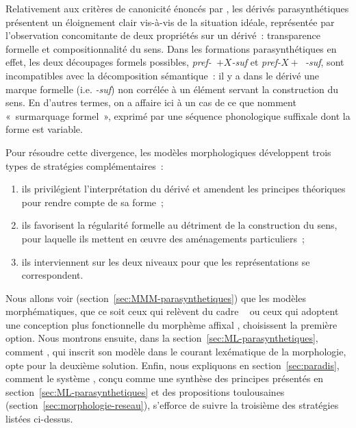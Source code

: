 \documentclass[output=paper]{langsci/langscibook}
\begin{document}


Relativement aux critères de canonicité énoncés par \citet{Corbett10}, les dérivés parasynthétiques présentent un éloignement clair vis-à-vis de la situation idéale, représentée par l'observation concomitante de deux propriétés sur un dérivé~: transparence formelle et compositionnalité du sens. Dans les formations  parasynthétiques en effet, les deux découpages formels possibles, \emph{\mbox{pref- $+ X$-suf}} et \emph{\mbox{pref-$X +$ -suf}},  sont incompatibles avec la décomposition sémantique~: il y a dans le dérivé une marque formelle (i.e. \emph{\mbox{-suf}}) non corrélée à un élément servant la construction du sens.  En d'autres termes, on a affaire ici à un cas de ce que \citet{hathout2014.imm15} nomment «~surmarquage formel~», exprimé par une séquence phonologique suffixale dont la forme est variable.

Pour résoudre cette divergence, les modèles morphologiques développent trois types de stratégies complémentaires~:
\begin{enumerate}
\item ils privilégient l'interprétation du dérivé et amendent les principes théoriques pour rendre compte de sa forme~;
\item ils favorisent la régularité formelle au détriment de la construction du sens, pour laquelle ils mettent en œuvre des aménagements particuliers~;
\item  ils interviennent sur les deux niveaux pour que les représentations se correspondent.
\end{enumerate}

Nous allons voir (section~\ref{sec:MMM-parasynthetiques}) que les modèles morphématiques, que ce soit ceux qui relèvent du cadre \itemarr\  ou ceux qui adoptent une conception plus fonctionnelle du morphème affixal \citep{Corbin87}, choisissent la première option.  Nous montrons ensuite, dans la section~\ref{sec:ML-parasynthetiques}, comment \citet{Fradin03}, qui inscrit son modèle dans le courant lexématique de la morphologie, opte pour la deuxième solution. Enfin, nous expliquons en section~\ref{sec:paradis}, comment le système \paradis{}, conçu comme une synthèse des principes présentés en section~\ref{sec:ML-parasynthetiques} et des propositions toulousaines (section~\ref{sec:morphologie-reseau}), s'efforce de suivre la troisième des stratégies listées ci-dessus.
\end{document}
